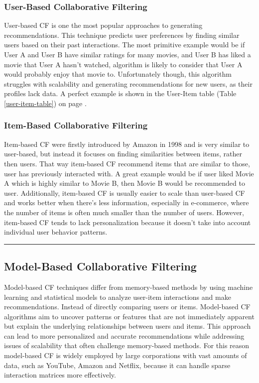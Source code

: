 \documentclass[10pt,a4paper]{article}
\begin{document}
\subsubsection{User-Based Collaborative Filtering}
User-based CF is one the most popular approaches to generating recommendations. This technique predicts user preferences by finding similar users based on their past interactions. The most primitive example would be if User A and User B have similar ratings for many movies, and User B has liked a movie that User A hasn't watched, algorithm is likely to consider that User A would probably enjoy that movie to. Unfortunately though, this algorithm struggles with scalability and generating recommendations for new users, as their profiles lack data. A perfect example is shown in the User-Item table (Table \ref{user-item-table}) on page \pageref{user-item-table}. \cite{8506344} \cite{10.1155/2009/421425}

\subsubsection{Item-Based Collaborative Filtering}
Item-based CF were firstly introduced by Amazon in 1998 and is very similar to user-based, but instead it focuses on finding similarities between items, rather then users. That way item-based CF recommend items that are similar to those, user has previously interacted with. A great example would be if user liked Movie A which is highly similar to Movie B, then Movie B would be recommended to user. Additionally, item-based CF is usually easier to scale than user-based CF and works better when there's less information, especially in e-commerce, where the number of items is often much smaller than the number of users. However, item-based CF tends to lack personalization because it doesn’t take into account individual user behavior patterns. \cite{8506344}

\hspace{0.1cm}
\hrule
\hspace{0.1cm}

\subsection{Model-Based Collaborative Filtering}
Model-based CF techniques differ from memory-based methods by using machine learning and statistical models to analyze user-item interactions and make recommendations. Instead of directly comparing users or items. Model-based CF algorithms aim to uncover patterns or features that are not immediately apparent but explain the underlying relationships between users and items. This approach can lead to more personalized and accurate recommendations while addressing issues of scalability that often challenge memory-based methods. For this reason model-based CF is widely employed by large corporations with vast amounts of data, such as YouTube, Amazon and Netflix, because it can handle sparse interaction matrices more effectively.
\end{document}
